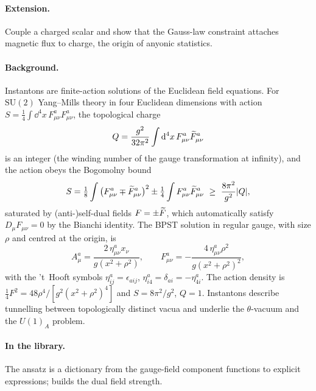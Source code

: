 \paragraph{Extension.} Couple a charged scalar and show that the Gauss-law constraint attaches magnetic flux to charge, the origin of anyonic statistics.


\paragraph{Background.} Instantons are finite-action solutions of the Euclidean field equations. For $\mathrm{SU}(2)$ Yang--Mills theory in four Euclidean dimensions with action $S=\tfrac14\int\dd^4x\,F^a_{\mu\nu}F^a_{\mu\nu}$, the topological charge
\begin{equation}
Q=\frac{g^2}{32\pi^2}\int\mathrm{d}^4x\,F^a_{\mu\nu}\widetilde{F}^a_{\mu\nu}
\end{equation}
is an integer (the winding number of the gauge transformation at infinity), and the action obeys the Bogomolny bound \cite{BPST1975}
\begin{equation}
S=\tfrac18\int\big(F^a_{\mu\nu}\mp\dual F^a_{\mu\nu}\big)^2\pm\tfrac14\int F^a_{\mu\nu}\dual F^a_{\mu\nu}\ \ge\ \frac{8\pi^2}{g^2}|Q|,
\end{equation}
saturated by (anti-)self-dual fields $F=\pm\widetilde{F}$, which automatically satisfy $D_\mu F_{\mu\nu}=0$ by the Bianchi identity. The BPST solution in regular gauge, with size $\rho$ and centred at the origin, is
\begin{equation}
A^a_\mu=\frac{2\,\eta^a_{\mu\nu}x_\nu}{g(x^2+\rho^2)},\qquad
F^a_{\mu\nu}=-\frac{4\,\eta^a_{\mu\nu}\rho^2}{g(x^2+\rho^2)^2},
\end{equation}
with the 't~Hooft symbols $\eta^a_{ij}=\epsilon_{aij}$, $\eta^a_{i4}=\delta_{ai}=-\eta^a_{4i}$. The action density is $\tfrac14F^2=48\rho^4/[g^2(x^2+\rho^2)^4]$ and $S=8\pi^2/g^2$, $Q=1$. Instantons describe tunnelling between topologically distinct vacua and underlie the $\theta$-vacuum and the $U(1)_A$ problem.

\paragraph{In the library.} The ansatz is a dictionary from the gauge-field component functions to explicit expressions;  builds the dual field strength.


